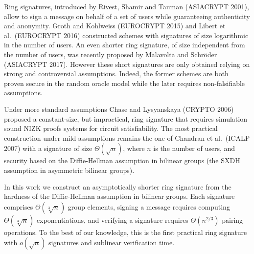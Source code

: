 
Ring signatures, introduced by Rivest, Shamir and Tauman (ASIACRYPT 2001), allow to sign a message on behalf of a set of users while guaranteeing authenticity and anonymity. Groth and Kohlweiss (EUROCRYPT 2015) and Libert et al.~(EUROCRYPT 2016) constructed schemes with signatures of size logarithmic in the number of users. An even shorter ring signature, of size independent from the number of users, was recently proposed by Malavolta and  Schr\"oder (ASIACRYPT 2017).
However these short signatures are only obtained relying on strong and controversial assumptions.
Indeed, the former schemes are both proven secure in the random oracle model while the later requires non-falsifiable assumptions.

Under more standard assumptions Chase and Lysyanskaya (CRYPTO 2006) proposed a constant-size, but impractical, ring signature that requires simulation sound NIZK proofs systems for circuit satisfiability.
The most practical construction under mild assumptions remains the one of Chandran et al.~(ICALP 2007) with a signature of size $\Theta(\sqrt{n})$, where $n$ is the number of users, and security based on the Diffie-Hellman assumption in bilinear groups (the SXDH assumption in asymmetric bilinear groups).

In this work we construct an asymptotically shorter ring signature from the hardness of the Diffie-Hellman assumption in bilinear groups.
 Each signature comprises $\Theta(\sqrt[3]{n})$ group elements, signing a message requires computing $\Theta(\sqrt[3]{n})$ exponentiations, and verifying a signature requires $\Theta(n^{2/3})$ pairing operations. To the best of our knowledge, this is the first practical ring signature with $o(\sqrt{n})$ signatures and sublinear verification time.
